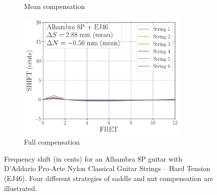 \begin{figure}
\begin{subfigure}[b]{0.45\textwidth}
   \caption{Mean compensation}
   \label{fig:shift_alhambra8p_ej46_mean}
  \end{subfigure}
  \hspace{0.25in}
  \begin{subfigure}[b]{0.45\textwidth}
   \centering
   \includegraphics[width=3.25in]{figures/shift_alhambra8p_ej46_full}
   \caption{Full compensation}
   \label{fig:shift_alhambra8p_ej46_full}
  \end{subfigure}
  \caption{\label{fig:compensation} Frequency shift (in cents) for an Alhambra 8P guitar with D'Addario Pro-Arte Nylon Classical Guitar Strings -- Hard Tension (EJ46). Four different strategies of saddle and nut compensation are illustrated.}
 \end{figure}

